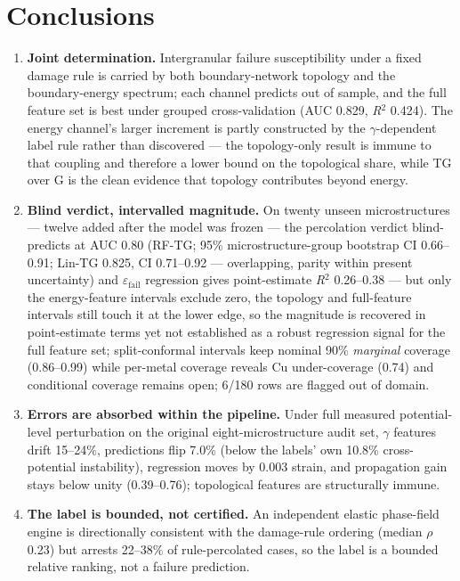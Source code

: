 \documentclass[11pt]{article}
\begin{document}
\section{Conclusions}

\begin{enumerate}
\item \textbf{Joint determination.} Intergranular failure susceptibility under a fixed damage rule is carried by both boundary-network topology and the boundary-energy spectrum; each channel predicts out of sample, and the full feature set is best under grouped cross-validation (AUC 0.829, \textit{R}$^{2}$ 0.424). The energy channel's larger increment is partly constructed by the $\gamma$-dependent label rule rather than discovered --- the topology-only result is immune to that coupling and therefore a lower bound on the topological share, while TG over G is the clean evidence that topology contributes beyond energy.
\item \textbf{Blind verdict, intervalled magnitude.} On twenty unseen microstructures --- twelve added after the model was frozen --- the percolation verdict blind-predicts at AUC 0.80 (RF-TG; 95\% microstructure-group bootstrap CI 0.66--0.91; Lin-TG 0.825, CI 0.71--0.92 --- overlapping, parity within present uncertainty) and $\varepsilon_{\mathrm{fail}}$ regression gives point-estimate \textit{R}$^{2}$ 0.26--0.38 --- but only the energy-feature intervals exclude zero, the topology and full-feature intervals still touch it at the lower edge, so the magnitude is recovered in point-estimate terms yet not established as a robust regression signal for the full feature set; split-conformal intervals keep nominal 90\% \textit{marginal} coverage (0.86--0.99) while per-metal coverage reveals Cu under-coverage (0.74) and conditional coverage remains open; 6/180 rows are flagged out of domain.
\item \textbf{Errors are absorbed within the pipeline.} Under full measured potential-level perturbation on the original eight-microstructure audit set, $\gamma$ features drift 15--24\%, predictions flip 7.0\% (below the labels' own 10.8\% cross-potential instability), regression moves by 0.003 strain, and propagation gain stays below unity (0.39--0.76); topological features are structurally immune.
\item \textbf{The label is bounded, not certified.} An independent elastic phase-field engine is directionally consistent with the damage-rule ordering (median $\rho$ 0.23) but arrests 22--38\% of rule-percolated cases, so the label is a bounded relative ranking, not a failure prediction.
\end{enumerate}
\end{document}
